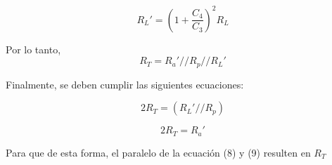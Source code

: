 \begin{equation}
    R_L' = (1+\frac{C_4}{C_3})^2R_L
\end{equation}

Por lo tanto,
\begin{equation}
    R_T = R_a'//R_p//R_L' 
\end{equation}

Finalmente, se deben cumplir las siguientes ecuaciones:

\begin{equation}
    2R_T = (R_L'//R_p) 
\end{equation}

\begin{equation}
    2R_T = R_a' 
\end{equation}

Para que de esta forma, el paralelo de la ecuación (8) y (9) resulten en \(R_T\) 
\newpage
